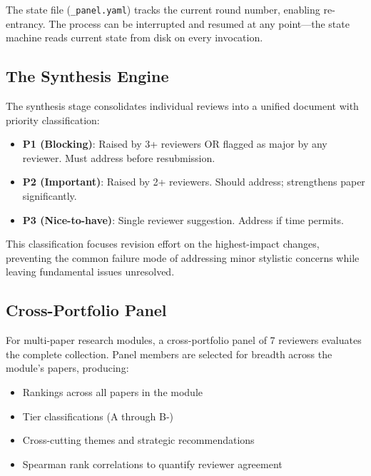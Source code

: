 The state file (\texttt{\_panel.yaml}) tracks the current round number, enabling re-entrancy. The process can be interrupted and resumed at any point---the state machine reads current state from disk on every invocation.

\subsection{The Synthesis Engine}

The synthesis stage consolidates individual reviews into a unified document with priority classification:

\begin{itemize}
    \item \textbf{P1 (Blocking)}: Raised by 3+ reviewers OR flagged as major by any reviewer. Must address before resubmission.
    \item \textbf{P2 (Important)}: Raised by 2+ reviewers. Should address; strengthens paper significantly.
    \item \textbf{P3 (Nice-to-have)}: Single reviewer suggestion. Address if time permits.
\end{itemize}

This classification focuses revision effort on the highest-impact changes, preventing the common failure mode of addressing minor stylistic concerns while leaving fundamental issues unresolved.

\subsection{Cross-Portfolio Panel}

For multi-paper research modules, a cross-portfolio panel of 7 reviewers evaluates the complete collection. Panel members are selected for breadth across the module's papers, producing:
\begin{itemize}
    \item Rankings across all papers in the module
    \item Tier classifications (A through B-)
    \item Cross-cutting themes and strategic recommendations
    \item Spearman rank correlations to quantify reviewer agreement
\end{itemize}
